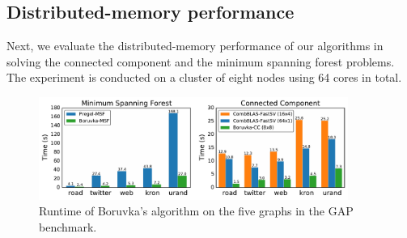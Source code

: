 \documentclass{sokendai_thesis} %
\newcommand{\boruvka}[0]{Boruvka}
\begin{document}

\subsection{Distributed-memory performance}
\label{sec:performance}

Next, we evaluate the distributed-memory performance of our algorithms in solving the connected component and the minimum spanning forest problems.
The experiment is conducted on a cluster of eight nodes using 64 cores in total.

\begin{figure}[t]
\centering
\includegraphics[width=0.9\textwidth]{figures/runtime.pdf}
\caption{Runtime of \boruvka{}'s algorithm on the five graphs in the GAP benchmark.}
\vspace{-8pt}
\label{fig:runtime}
\end{figure}
\end{document}
